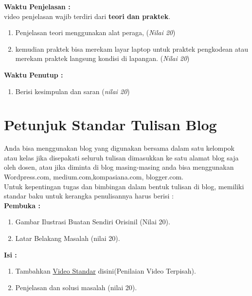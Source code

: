 \textbf{Waktu	Penjelasan	:}\\
video	penjelasan	wajib	terdiri	dari \textbf{teori	dan	praktek}.
\begin{enumerate}
\item Penjelasan	teori	menggunakan	alat	peraga, (\textit{Nilai	20})
\item kemudian	praktek	bisa	merekam	layar	laptop	untuk	praktek	pengkodean	atau	merekam	praktek	langsung	kondisi	di	lapangan. (\textit{Nilai	20})
\end{enumerate}

\textbf{Waktu	Penutup	:}
\begin{enumerate}
\item Berisi	kesimpulan	dan	saran (\textit{nilai 20})
\end{enumerate}

\section{Petunjuk	Standar	Tulisan	Blog}
Anda	bisa	menggunakan	blog	yang	digunakan	bersama	dalam	satu	kelompok	atau	kelas	jika	disepakati	seluruh	tulisan	dimasukkan	ke	satu	alamat	blog	saja	oleh	dosen,	atau	jika	diminta	di	blog	masing-masing	anda	bisa	menggunakan	Wordpress.com,	medium.com,kompasiana.com,	blogger.com. \\
Untuk	kepentingan	tugas	dan	bimbingan	dalam	bentuk	tulisan	di	blog,	memiliki	standar	baku	untuk	kerangka	penulisannya	harus	berisi	:\\
\textbf{Pembuka :}
\begin{enumerate}
\item Gambar	Ilustrasi	Buatan	Sendiri	Orisinil	(Nilai	20).
\item Latar	Belakang	Masalah	(nilai	20).
\end{enumerate}

\textbf{Isi :}
\begin{enumerate}
\item Tambahkan \underline{Video Standar} disini(Penilaian	Video	Terpisah).
\item Penjelasan	dan	solusi	masalah	(nilai	20).
\end{enumerate}


